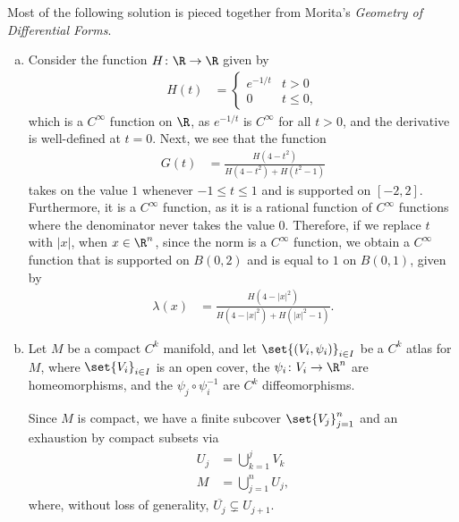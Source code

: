 \documentclass[10pt]{mypackage}
\begin{document}
\begin{remark}
  Most of the following solution is pieced together from Morita's \textit{Geometry of Differential Forms}.
\end{remark}
\begin{solution}\hfill
  \begin{enumerate}[(a)]
    \item Consider the function $H\colon \R\rightarrow \R$ given by
      \begin{align*}
        H(t) &= \begin{cases}
          e^{-1/t} & t > 0\\
          0 & t\leq 0,
        \end{cases}
      \end{align*}
      which is a $C^{\infty}$ function on $\R$, as $e^{-1/t}$ is $C^{\infty}$ for all $t > 0$, and the derivative is well-defined at $t = 0$. Next, we see that the function
      \begin{align*}
        G(t) &= \frac{H\left( 4-t^2 \right)}{H\left( 4-t^2 \right) + H\left( t^2 - 1 \right)}
      \end{align*}
      takes on the value $1$ whenever $-1\leq t \leq 1$ and is supported on $[-2,2]$. Furthermore, it is a $C^{\infty}$ function, as it is a rational function of $C^{\infty}$ functions where the denominator never takes the value $0$. Therefore, if we replace $t$ with $\left\vert x \right\vert$, when $x \in \R^{n}$, since the norm is a $C^{\infty}$ function, we obtain a $C^{\infty}$ function that is supported on $B\left( 0,2 \right)$ and is equal to $1$ on $B\left( 0,1 \right)$, given by
      \begin{align*}
        \lambda\left( x \right) &= \frac{H\left( 4-\left\vert x \right\vert^2 \right)}{H\left( 4-\left\vert x \right\vert^2 \right) + H\left( \left\vert x \right\vert^2 - 1 \right)}.
      \end{align*}
    \item Let $M$ be a compact $C^{k}$ manifold, and let $\set{\left( V_i,\psi_i \right)}_{i\in I}$ be a $C^{k}$ atlas for $M$, where  $\set{V_i}_{i\in I}$ is an open cover, the $\psi_i\colon V_i\rightarrow \R^{n}$ are homeomorphisms, and the $\psi_{j}\circ \psi_{i}^{-1}$ are $C^{k}$ diffeomorphisms.\newline

      Since $M$ is compact, we have a finite subcover $\set{V_j}_{j=1}^{n}$ and an exhaustion by compact subsets via
      \begin{align*}
        U_{j} &= \bigcup_{k=1}^{j} V_k\\
        M &= \bigcup_{j=1}^{n}U_j,
      \end{align*}
      where, without loss of generality, $ \overline{U_{j}} \subsetneq U_{j+1}$.\newline


\end{enumerate}
\end{solution}
\end{document}
